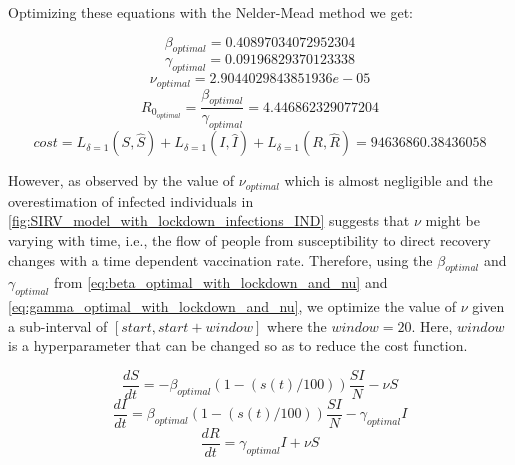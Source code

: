 \documentclass[tikz,fleqn,12pt]{wlscirep}
\begin{document}
Optimizing these equations with the Nelder-Mead method we get:

\begin{equation}
  \beta_{optimal} = 0.40897034072952304
  \label{eq:beta_optimal_with_lockdown_and_nu}
\end{equation}
\begin{equation}
  \gamma_{optimal} = 0.09196829370123338
  \label{eq:gamma_optimal_with_lockdown_and_nu}
\end{equation}
\begin{equation}
  \nu_{optimal} = 2.9044029843851936e-05
  \label{eq:nu_optimal_with_lockdown_and_nu}
\end{equation}
\begin{equation}
  R_{0_{optimal}} = \frac{\beta_{optimal}}{\gamma_{optimal}} = 4.446862329077204
  \label{eq:r0_with_lockdown_and_nu}
\end{equation}
\begin{equation}
  cost = L_{\delta = 1}(S, \hat{S}) + L_{\delta = 1}(I, \hat{I}) + L_{\delta = 1}(R, \hat{R}) = 94636860.38436058
  \label{eq:cost_with_lockdown_and_nu}
\end{equation}

However, as observed by the value of $\nu_{optimal}$ which is almost negligible and the overestimation of infected individuals in \ref{fig:SIRV_model_with_lockdown_infections_IND} suggests that $\nu$ might be varying with time, i.e., the flow of people from susceptibility to direct recovery changes with a time dependent vaccination rate. Therefore, using the $\beta_{optimal}$ and $\gamma_{optimal}$ from \ref{eq:beta_optimal_with_lockdown_and_nu} and \ref{eq:gamma_optimal_with_lockdown_and_nu}, we optimize the value of $\nu$ given a sub-interval of $[{start}, {start} + {window}]$ where the ${window} = 20$. Here, ${window}$ is a hyperparameter that can be changed so as to reduce the cost function.

\begin{equation}
  \frac{dS}{dt} = -\beta_{optimal}  (1 - (s(t)/100))  \frac{S I}{N} - \nu S
  \label{eq:S_with_lockdown_and_nu_calc_nu}
\end{equation}
\begin{equation}
  \frac{dI}{dt} = \beta_{optimal}  (1 - (s(t)/100)) \frac{S I}{N} - \gamma_{optimal} I
  \label{eq:I_with_lockdown_and_nu_calc_nu}
\end{equation}
\begin{equation}
  \frac{dR}{dt} = \gamma_{optimal} I + \nu S
  \label{eq:R_with_lockdown_and_nu_calc_nu}
\end{equation}
\end{document}

